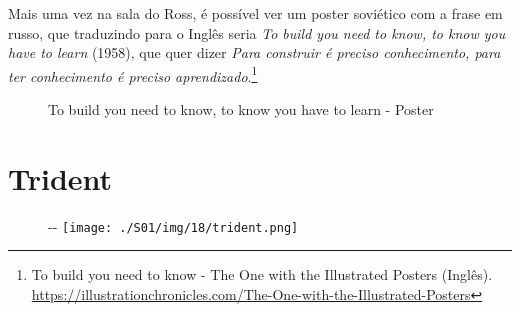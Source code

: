 \saveparinfos
\noindent
\begin{minipage}[c]{0.5\textwidth}\useparinfo

Mais uma vez na sala do Ross, é possível ver um poster soviético com a
frase em russo, que traduzindo para o Inglês seria \emph{To build you
need to know, to know you have to learn} (1958), que quer dizer
\emph{Para construir é preciso conhecimento, para ter conhecimento é
preciso aprendizado}.\footnote{\sloppy To build you need to know - The One with the Illustrated Posters (Inglês). \url{https://illustrationchronicles.com/The-One-with-the-Illustrated-Posters}}

\end{minipage}\hfill
\begin{minipage}[c]{0.4\textwidth}

\begin{figure}
  \centering
    \caption{To build you need to know, to know you have to learn - Poster\label{fig:to-build-you-need-to-know-to-know-you-have-to-learn-poster}}
\end{figure}

\end{minipage}

\hypertarget{trident}{%
\section{Trident}\label{trident}}

\begin{figure}[!ht]
  \begin{adjustwidth}{-\oddsidemargin-1in}{-\rightmargin}
    \centering
    \texttt{[image: ./S01/img/18/trident.png]}
  \end{adjustwidth}
\end{figure}

